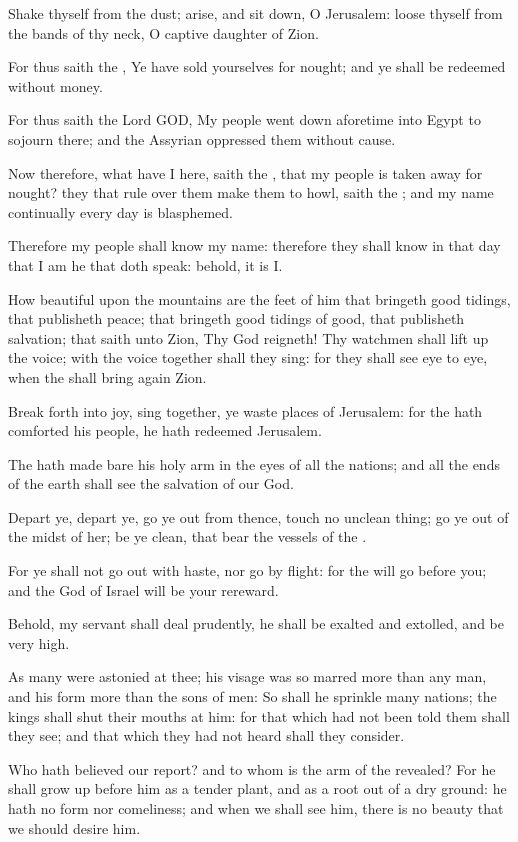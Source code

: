 \Verse Shake thyself from the dust; arise, and sit down, O Jerusalem: loose thyself from the bands of thy neck, O captive daughter of Zion.

\Verse For thus saith the \LORD, Ye have sold yourselves for nought; and ye shall be redeemed without money.

\Verse For thus saith the Lord GOD, My people went down aforetime into Egypt to sojourn there; and the Assyrian oppressed them without cause.

\Verse Now therefore, what have I here, saith the \LORD, that my people is taken away for nought? they that rule over them make them to howl, saith the \LORD; and my name continually every day is blasphemed.

\Verse Therefore my people shall know my name: therefore they shall know in that day that I am he that doth speak: behold, it is I.

\Verse How beautiful upon the mountains are the feet of him that bringeth good tidings, that publisheth peace; that bringeth good tidings of good, that publisheth salvation; that saith unto Zion, Thy God reigneth!  \Verse Thy watchmen shall lift up the voice; with the voice together shall they sing: for they shall see eye to eye, when the \LORD shall bring again Zion.

\Verse Break forth into joy, sing together, ye waste places of Jerusalem: for the \LORD hath comforted his people, he hath redeemed Jerusalem.

\Verse The \LORD hath made bare his holy arm in the eyes of all the nations; and all the ends of the earth shall see the salvation of our God.

\Verse Depart ye, depart ye, go ye out from thence, touch no unclean thing; go ye out of the midst of her; be ye clean, that bear the vessels of the \LORD.

\Verse For ye shall not go out with haste, nor go by flight: for the \LORD will go before you; and the God of Israel will be your rereward.

\Verse Behold, my servant shall deal prudently, he shall be exalted and extolled, and be very high.

\Verse As many were astonied at thee; his visage was so marred more than any man, and his form more than the sons of men: \Verse So shall he sprinkle many nations; the kings shall shut their mouths at him: for that which had not been told them shall they see; and that which they had not heard shall they consider.


\Chapter
\Verse Who hath believed our report? and to whom is the arm of the \LORD revealed?  \Verse For he shall grow up before him as a tender plant, and as a root out of a dry ground: he hath no form nor comeliness; and when we shall see him, there is no beauty that we should desire him.

